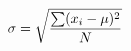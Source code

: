 \documentclass[preview]{standalone}
\begin{document}
\begin{align*}
\special{dvisvgm:raw <g id='unique000'>}\sigma = \sqrt{\frac{\sum (x_i - \mu)^2}{N}}\special{dvisvgm:raw </g>}
\end{align*}
\end{document}
